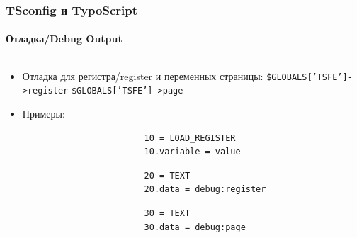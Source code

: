 \begin{frame}[fragile]
	\frametitle{TSconfig и TypoScript}
	\framesubtitle{Отладка/Debug Output}

	\begin{columns}[T]

		\begin{column}{.6\textwidth}
			\begin{itemize}
				\item Отладка для регистра/register и переменных страницы:\newline
					\texttt{\$GLOBALS['TSFE']->register}\newline
					\texttt{\$GLOBALS['TSFE']->page}

				\item Примеры:

					\begin{lstlisting}
						10 = LOAD_REGISTER
						10.variable = value
					\end{lstlisting}

					\begin{lstlisting}
						20 = TEXT
						20.data = debug:register
					\end{lstlisting}

					\begin{lstlisting}
						30 = TEXT
						30.data = debug:page
					\end{lstlisting}

			\end{itemize}
		\end{column}


\end{columns}
\end{frame}
